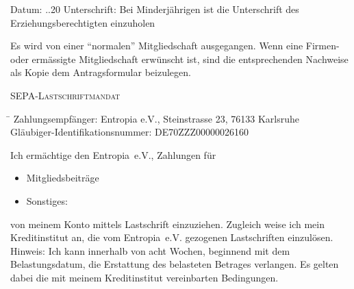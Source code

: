 \documentclass{scrartcl}
\begin{document}
Datum: \hspace{2pt} \underline{\hspace{20pt}}.\underline{\hspace{20pt}}.20\underline{\hspace{20pt}} Unterschrift: \hspace{2pt} \underline{\hspace{10cm}} 
\footnotesize
Bei Minderj\"ahrigen ist die Unterschrift des Erziehungsberechtigten einzuholen
\normalsize

\addvspace{0.2cm}

\footnotesize
Es wird von einer "`normalen"' Mitgliedschaft ausgegangen. Wenn eine Firmen- oder erm\"assigte Mitgliedschaft erw\"unscht ist, sind die
entsprechenden Nachweise als Kopie dem Antragsformular beizulegen.
\normalsize

\addvspace{1cm}
\begin{center}\begin{Large} \textsc{SEPA-Lastschriftmandat}\end{Large}\end{center}
\begin{tabbing}
\hspace*{7cm}\= \hspace*{7cm} \kill
Zahlungsempf\"anger: \> Entropia e.V., Steinstrasse 23, 76133 Karlsruhe\\

Gl\"aubiger-Identifikationsnummer: \> DE70ZZZ00000026160
\end{tabbing}
Ich erm\"achtige den Entropia~e.\thinspace V., Zahlungen f\"ur

\begin{itemize}
  \item[\Square] Mitgliedsbeitr\"age
  \item[\Square] Sonstiges: \hrulefill
\end{itemize}

von meinem Konto mittels Lastschrift einzuziehen. Zugleich weise ich mein Kreditinstitut an, die vom Entropia~e.\thinspace V. gezogenen Lastschriften einzul\"osen.\\

\footnotesize
Hinweis: Ich kann innerhalb von acht Wochen, beginnend mit dem Belastungsdatum, die Erstattung des belasteten Betrages verlangen. Es gelten dabei die mit meinem Kreditinstitut vereinbarten Bedingungen.
\normalsize
\end{document}
